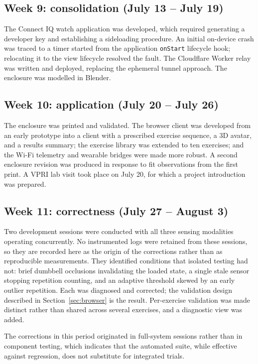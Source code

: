 \documentclass[11pt,a4paper]{article}
\newcommand{\code}[1]{\texttt{\small #1}}
\begin{document}
\subsection{Week 9: consolidation (July 13 -- July 19)}

The Connect IQ watch application was developed, which required generating a
developer key and establishing a sideloading procedure. An initial on-device
crash was traced to a timer started from the application \code{onStart} lifecycle
hook; relocating it to the view lifecycle resolved the fault. The Cloudflare
Worker relay was written and deployed, replacing the ephemeral tunnel approach.
The enclosure was modelled in Blender.

\subsection{Week 10: application (July 20 -- July 26)}

The enclosure was printed and validated. The browser client was developed from an
early prototype into a client with a prescribed exercise sequence, a 3D avatar,
and a results summary; the exercise library was extended to ten exercises; and the
Wi-Fi telemetry and wearable bridges were made more robust. A second enclosure
revision was produced in response to fit observations from the first print. A VPRI
lab visit took place on July 20, for which a project introduction was prepared.

\subsection{Week 11: correctness (July 27 -- August 3)}

Two development sessions were conducted with all three sensing modalities
operating concurrently. No instrumented logs were retained from these sessions,
so they are recorded here as the origin of the corrections rather than as
reproducible measurements. They identified conditions that isolated testing had
not: brief
dumbbell occlusions invalidating the loaded state, a single stale sensor stopping
repetition counting, and an adaptive threshold skewed by an early outlier
repetition. Each was diagnosed and corrected; the validation design described in
Section~\ref{sec:browser} is the result. Per-exercise validation was made
distinct rather than shared across several exercises, and a diagnostic view was
added.

The corrections in this period originated in full-system sessions rather than in
component testing, which indicates that the automated suite, while effective
against regression, does not substitute for integrated trials.
\end{document}
